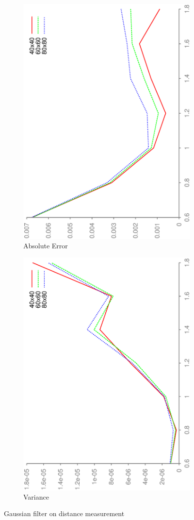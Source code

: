 \documentclass[DIV12,a4paper]{scrartcl}
\begin{document}
\begin{figure}[h!tbp]
  \centering
  \begin{subfigure}[b]{.5\textwidth}
    \centering
    \includegraphics[height=\textwidth, angle=270]{figures/mean_gauss_error.eps}
    \caption{Absolute Error}
  \end{subfigure}%
  \begin{subfigure}[b]{.5\textwidth}
    \centering
    \includegraphics[height=\textwidth, angle=270]{figures/mean_gauss_variance.eps}
    \caption{Variance}
  \end{subfigure}
  \caption{Gaussian filter on distance measurement}
  \label{fig:gauss_noise}
\end{figure}
\end{document}
